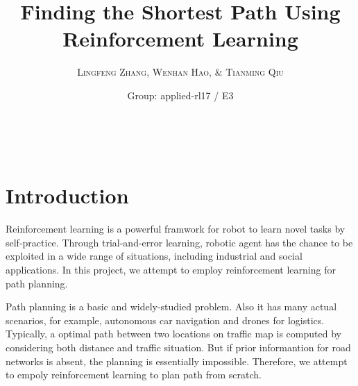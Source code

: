 \documentclass[a4paper, 11pt]{article} %
\title{\textbf{Finding the Shortest Path Using Reinforcement Learning}} %
\author{\textsc{Lingfeng Zhang, Wenhan Hao, $\&$ Tianming Qiu} %
\\{\textit{}}} %
\date{Group: applied-rl17 / E3} %
\makeatletter
\renewcommand{\maketitle}{ %
\begin{flushright} %
{\LARGE\@title} %

\vspace{50pt} %

{\large\@author} %
\\\@date %

\vspace{40pt} %
\end{flushright}
}
\makeatother
\begin{document}
\maketitle %



\section{Introduction}
Reinforcement learning is a powerful framwork for robot to learn novel tasks by
self-practice. Through trial-and-error learning, robotic agent has the chance to
be exploited in a wide range of situations, including industrial and social
applications. In this project, we attempt to employ reinforcement learning for
path planning.

Path planning is a basic and widely-studied problem. Also it has many actual
scenarios, for example, autonomous car navigation and drones for logistics.
Typically, a optimal path between two locations on traffic map is computed by
considering both distance and traffic situation. But if prior informantion for
road networks is absent, the planning is essentially impossible. Therefore,
we attempt to empoly reinforcement learning to plan path from scratch.
\end{document}
